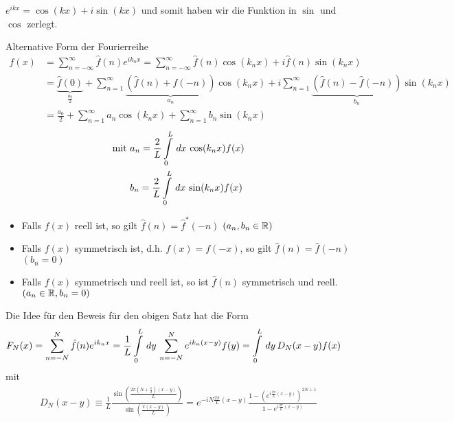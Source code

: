 \begin{Bemerkung}
$e^{ikx} = \cos(kx) + i\sin(kx)$ und somit haben wir die Funktion in $\sin$ und
$\cos$ zerlegt.
\end{Bemerkung}
\begin{Bemerkung}
Alternative Form der Fourierreihe
\begin{align*}
f(x) &= \sum \limits_{n=-\infty}^{\infty} \hat{f}(n)e^{i k_n x} = \sum
\limits_{n = -\infty}^{\infty} \hat{f}(n) \cos(k_n x) + i\hat{f}(n) \sin(k_n
x)\\
&= \underbrace{\hat{f}(0)}_{\frac{a_0}{2}} + \sum \limits_{n=1}^{\infty}
\underbrace{\left(\hat{f}(n) + \hat{f}(-n) \right)}_{a_n} \cos(k_n x) + i\sum
\limits_{n=1}^{\infty} \underbrace{\left( \hat{f}(n) - \hat{f}(-n)
\right)}_{b_n} \sin(k_n x) \\
&= \frac{a_0}{2} + \sum\limits_{n=1}^{\infty} a_n
\cos(k_n x) + \sum \limits_{n=1}^{\infty} b_n \sin(k_n x)
\end{align*}
\begin{align*}
\text{mit } & a_n = \frac{2}{L} \int \limits_{0}^{L} \,dx\, \cos(k_n x)f(x)\\
&b_n = \frac{2}{L} \int \limits_{0}^{L} \,dx\, \sin(k_n x)f(x)
\end{align*}
\end{Bemerkung}
\begin{Bemerkung}
\par
\begin{itemize}
  \item Falls $f(x)$ reell ist, so gilt $\hat{f}(n) = \hat{f}^*(-n)$ $(a_n,
  b_n \in \mathbb{R})$
  \item Falls $f(x)$ symmetrisch ist, d.h. $f(x) = f(-x)$, so gilt $\hat{f}(n)
  = \hat{f}(-n)$ $(b_n = 0)$
  \item Falls $f(x)$ symmetrisch und reell ist, so ist $\hat{f}(n)$ symmetrisch
  und reell. $(a_n \in \mathbb{R}, b_n = 0)$
\end{itemize}
\end{Bemerkung}
Die Idee für den Beweis für den obigen Satz hat die Form
\begin{align*}
F_N(x) &= \sum \limits_{n=-N}^{N} \hat{f}(n) e^{i k_n x} = \frac{1}{L} \int
\limits_{0}^{L} \,dy\, \sum \limits_{n=-N}^{N} e^{i k_n (x-y)} f(y) = \int
\limits_{0}^{L} \,dy\, D_N (x-y) f(x)
\end{align*}
mit
\begin{align*}
D_N(x-y) \equiv
\frac{1}{L}\frac{\sin\left(\frac{2\pi(N+\frac{1}{2})(x-y)}{L}\right)}{\sin\left(\frac{\pi(x-y)}{L}\right)}
= e^{-i N \frac{2\pi}{L}(x-y)}\frac{1-
\left(e^{i\frac{2\pi}{L}(x-y)}\right)^{2N+1}}{1-e^{i\frac{2\pi}{L}(x-y)}}
\end{align*}
